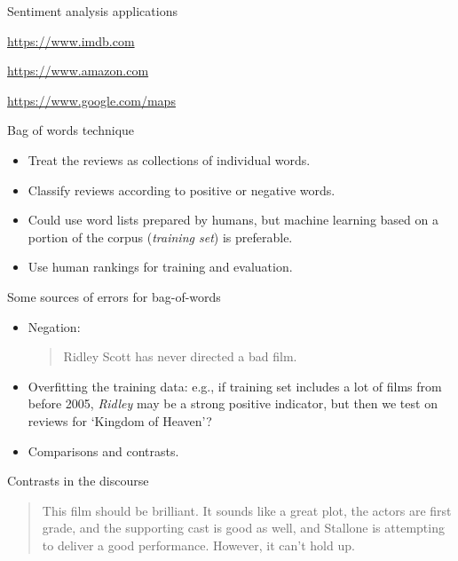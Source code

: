 \documentclass[compress]{beamer}
\begin{document}
\begin{frame}{Sentiment analysis applications}

  \url{https://www.imdb.com}

  \url{https://www.amazon.com}

  \url{https://www.google.com/maps}

\end{frame}


\begin{frame}{Bag of words technique}
  \begin{itemize}
  \item Treat the reviews as collections of individual words.
  \item Classify reviews according to positive or negative words.
  \item Could use word lists prepared by humans, but machine learning
    based on a portion of the corpus (\emph{training set}) is
    preferable.
  \item Use human rankings for training and evaluation.
\end{itemize}
\end{frame}


\begin{frame}{Some sources of errors for bag-of-words}
  \begin{itemize}
  \item Negation:
    \begin{quote}
      Ridley Scott has never directed a bad film.
    \end{quote}
  \item Overfitting the training data: e.g., if training set includes
    a lot of films from before 2005, {\it Ridley} may be a strong
    positive indicator, but then we test on reviews for `Kingdom of
    Heaven'?
  \item Comparisons and contrasts.
  \end{itemize}
\end{frame}

\begin{frame}{Contrasts in the discourse}
\begin{quote}
  This film should be brilliant. It sounds like a great plot, the
  actors are first grade, and the supporting cast is good as well, and
  Stallone is attempting to deliver a good performance.  However, it
  can't hold up.
\end{quote}
\end{frame}
\end{document}
